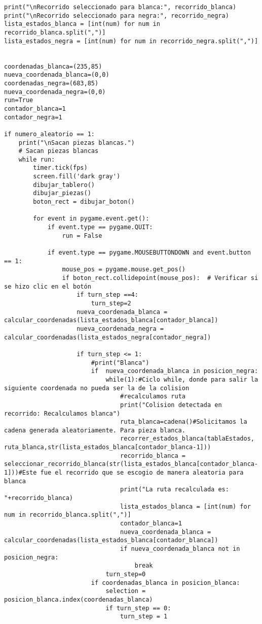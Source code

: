 \begin{lstlisting}
print("\nRecorrido seleccionado para blanca:", recorrido_blanca)
print("\nRecorrido seleccionado para negra:", recorrido_negra)
lista_estados_blanca = [int(num) for num in recorrido_blanca.split(",")]
lista_estados_negra = [int(num) for num in recorrido_negra.split(",")]


coordenadas_blanca=(235,85)
nueva_coordenada_blanca=(0,0)
coordenadas_negra=(683,85)
nueva_coordenada_negra=(0,0)
run=True
contador_blanca=1
contador_negra=1

if numero_aleatorio == 1:
    print("\nSacan piezas blancas.")
    # Sacan piezas blancas
    while run:
        timer.tick(fps)
        screen.fill('dark gray')
        dibujar_tablero()
        dibujar_piezas()
        boton_rect = dibujar_boton()

        for event in pygame.event.get():
            if event.type == pygame.QUIT:
                run = False

            if event.type == pygame.MOUSEBUTTONDOWN and event.button == 1:
                mouse_pos = pygame.mouse.get_pos()
                if boton_rect.collidepoint(mouse_pos):  # Verificar si se hizo clic en el botón
                    if turn_step ==4:
                        turn_step=2
                    nueva_coordenada_blanca = calcular_coordenadas(lista_estados_blanca[contador_blanca])
                    nueva_coordenada_negra = calcular_coordenadas(lista_estados_negra[contador_negra])
                    
                    if turn_step <= 1:
                        #print("Blanca")
                        if  nueva_coordenada_blanca in posicion_negra:
                            while(1):#Ciclo while, donde para salir la siguiente coordenada no pueda ser la de la colision
                                #recalculamos ruta
                                print("Colision detectada en recorrido: Recalculamos blanca")
                                ruta_blanca=cadena()#Solicitamos la cadena generada aleatoriamente. Para pieza blanca.
                                recorrer_estados_blanca(tablaEstados, ruta_blanca,str(lista_estados_blanca[contador_blanca-1]))
                                recorrido_blanca = seleccionar_recorrido_blanca(str(lista_estados_blanca[contador_blanca-1]))#Este fue el recorrido que se escogio de manera aleatoria para blanca
                                print("La ruta recalculada es: "+recorrido_blanca)
                                lista_estados_blanca = [int(num) for num in recorrido_blanca.split(",")]
                                contador_blanca=1
                                nueva_coordenada_blanca = calcular_coordenadas(lista_estados_blanca[contador_blanca])
                                if nueva_coordenada_blanca not in posicion_negra:
                                    break
                            turn_step=0
                        if coordenadas_blanca in posicion_blanca:
                            selection = posicion_blanca.index(coordenadas_blanca)
                            if turn_step == 0:
                                turn_step = 1
                        

\end{lstlisting}
